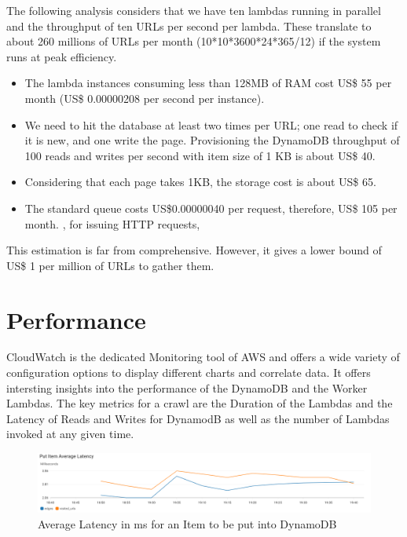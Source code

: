 \documentclass[english]{scrartcl}
\begin{document}
The following analysis considers that we have ten lambdas running in parallel and the throughput of ten URLs per second per lambda. These translate to about 260 millions of URLs per month (10*10*3600*24*365/12) if the system runs at peak efficiency.


\begin{itemize}
    \item The lambda instances consuming less than 128MB of RAM cost US\$ 55 per month (US\$ 0.00000208 per second per instance).
    \item We need to hit the database at least two times per URL; one read to check if it is new, and one write the page. Provisioning the DynamoDB throughput of 100 reads and writes per second with item size of 1 KB is about US\$ 40.
    \item Considering that each page takes 1KB, the storage cost is about US\$ 65.
    \item The standard queue costs US\$0.00000040 per request, therefore, US\$ 105 per month. , for issuing HTTP requests,
\end{itemize}

This estimation is far from comprehensive. However, it gives a lower bound of US\$ 1 per million of URLs to gather them.

\section{Performance}

CloudWatch is the dedicated Monitoring tool of AWS and offers a wide variety of configuration options to display different charts and correlate data.
It offers intersting insights into the performance of the DynamoDB and the Worker Lambdas. The key metrics for a crawl are the Duration of the Lambdas
and the Latency of Reads and Writes for DynamodB as well as the number of Lambdas invoked at any given time.

\begin{figure}[ht]
    \centering
    \includegraphics[width=\textwidth]{img/CloudWatchDynamoDBPutItemAverageLatency}
    \caption{Average Latency in ms for an Item to be put into DynamoDB}
    \label{fig:screenshot}
\end{figure}
\end{document}
